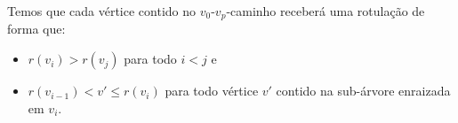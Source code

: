 \documentclass[a4paper,12pt]{article}
\begin{document}
	Temos que cada vértice contido no $v_0$-$v_p$-caminho receberá uma 
	rotulação de forma que:
	\begin{itemize}
		\item $r(v_i)>r(v_j)$ para todo $i<j$ e
		\item $r(v_{i-1})< v' \le r(v_i)$ para todo vértice $v'$ contido 
		na sub-árvore enraizada em $v_i$. 
	\end{itemize}










\newpage
\end{document}
